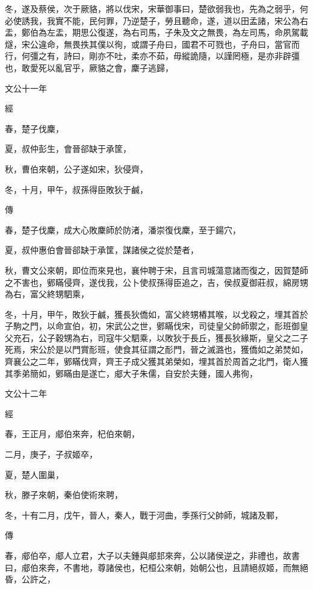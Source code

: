 \documentclass{ctexart}
\begin{document}
冬，遂及蔡侯，次于厥貉，將以伐宋，宋華御事曰，楚欲弱我也，先為之弱乎，何必使誘我，我實不能，民何罪，乃逆楚子，勞且聽命，遂，道以田孟諸，宋公為右盂，鄭伯為左盂，期思公復遂，為右司馬，子朱及文之無畏，為左司馬，命夙駕載燧，宋公違命，無畏抶其僕以徇，或謂子舟曰，國君不可戮也，子舟曰，當官而行，何彊之有，詩曰，剛亦不吐，柔亦不茹，毋縱詭隨，以謹罔極，是亦非辟彊也，敢愛死以亂官乎，厥貉之會，麇子逃歸，





文公十一年


經



春，楚子伐麇，

夏，叔仲彭生，會晉郤缺于承筐，

秋，曹伯來朝，公子遂如宋，狄侵齊，

冬，十月，甲午，叔孫得臣敗狄于鹹，

傳



春，楚子伐麇，成大心敗麇師於防渚，潘崇復伐麇，至于鍚穴，

夏，叔仲惠伯會晉郤缺于承筐，謀諸侯之從於楚者，

秋，曹文公來朝，即位而來見也，襄仲聘于宋，且言司城蕩意諸而復之，因賀楚師之不害也，鄋瞞侵齊，遂伐我，公卜使叔孫得臣追之，吉，侯叔夏御莊叔，綿房甥為右，富父終甥駟乘，

冬，十月，甲午，敗狄于鹹，獲長狄僑如，富父終甥樁其喉，以戈殺之，埋其首於子駒之門，以命宣伯，初，宋武公之世，鄋瞞伐宋，司徒皇父帥師禦之，耏班御皇父充石，公子穀甥為右，司寇牛父駟乘，以敗狄于長丘，獲長狄緣斯，皇父之二子死焉，宋公於是以門賞耏班，使食其征謂之耏門，晉之滅潞也，獲僑如之弟焚如，齊襄公之二年，鄋瞞伐齊，齊王子成父獲其弟榮如，埋其首於周首之北門，衛人獲其季弟簡如，鄋瞞由是遂亡，郕大子朱儒，自安於夫鍾，國人弗徇，





文公十二年


經



春，王正月，郕伯來奔，杞伯來朝，

二月，庚子，子叔姬卒，

夏，楚人圍巢，

秋，滕子來朝，秦伯使術來聘，

冬，十有二月，戊午，晉人，秦人，戰于河曲，季孫行父帥師，城諸及鄆，

傳



春，郕伯卒，郕人立君，大子以夫鍾與郕邽來奔，公以諸侯逆之，非禮也，故書曰，郕伯來奔，不書地，尊諸侯也，杞桓公來朝，始朝公也，且請絕叔姬，而無絕昏，公許之，
\end{document}
